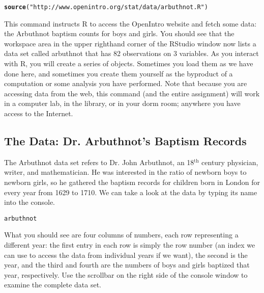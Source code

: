 \documentclass{article}\usepackage[]{graphicx}\usepackage[]{color}
\makeatletter
\newcommand{\hlstr}[1]{\textcolor[rgb]{0.192,0.494,0.8}{#1}}%
\newcommand{\hlstd}[1]{\textcolor[rgb]{0.345,0.345,0.345}{#1}}%
\newcommand{\hlkwd}[1]{\textcolor[rgb]{0.737,0.353,0.396}{\textbf{#1}}}%
\newenvironment{kframe}{%
 \def\at@end@of@kframe{}%
 \ifinner\ifhmode%
  \def\at@end@of@kframe{\end{minipage}}%
  \begin{minipage}{\columnwidth}%
 \fi\fi%
 \def\FrameCommand##1{\hskip\@totalleftmargin \hskip-\fboxsep
 \colorbox{shadecolor}{##1}\hskip-\fboxsep
     \hskip-\linewidth \hskip-\@totalleftmargin \hskip\columnwidth}%
 \MakeFramed {\advance\hsize-\width
   \@totalleftmargin\z@ \linewidth\hsize
   \@setminipage}}%
 {\par\unskip\endMakeFramed%
 \at@end@of@kframe}
\newenvironment{knitrout}{}{} %
\makeatother
\begin{document}
\begin{knitrout}
\color{fgcolor}\begin{kframe}
\begin{alltt}
\hlkwd{source}\hlstd{(}\hlstr{"http://www.openintro.org/stat/data/arbuthnot.R"}\hlstd{)}
\end{alltt}
\end{kframe}
\end{knitrout}


This command instructs R to access the OpenIntro website and fetch some data: the Arbuthnot baptism counts for boys and girls. You should see that the workspace area in the upper righthand corner of the RStudio window now lists a data set called \hlstd{arbuthnot} that has 82 observations on 3 variables. As you interact with R, you will create a series of objects. Sometimes you load them as we have done here, and sometimes you create them yourself as the byproduct of a computation or some analysis you have performed. Note that because you are accessing data from the web, this command (and the entire assignment) will work in a computer lab, in the library, or in your dorm room; anywhere you have access to the Internet.

\subsection*{The Data: Dr. Arbuthnot's Baptism Records}

The Arbuthnot data set refers to Dr. John Arbuthnot, an 18$^{\textrm{th}}$ century physician, writer, and mathematician.  He was interested in the ratio of newborn boys to newborn girls, so he gathered the baptism records for children born in London for every year from 1629 to 1710.  We can take a look at the data by typing its name into the console.

\begin{knitrout}
\color{fgcolor}\begin{kframe}
\begin{alltt}
\hlstd{arbuthnot}
\end{alltt}
\end{kframe}
\end{knitrout}


What you should see are four columns of numbers, each row representing a different year: the first entry in each row is simply the row number (an index we can use to access the data from individual years if we want), the second is the year, and the third and fourth are the numbers of boys and girls baptized that year, respectively. Use the scrollbar on the right side of the console window to examine the complete data set.
\end{document}
